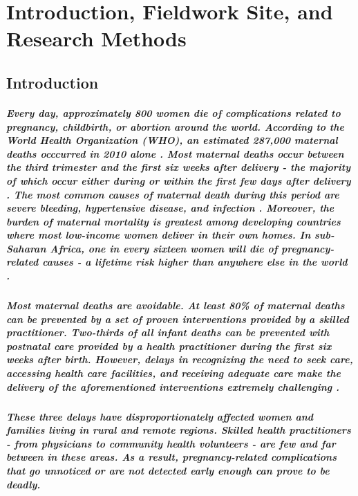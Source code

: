 \chapter{Introduction, Fieldwork Site, and Research Methods}
\section{Introduction}
\paragraph{Every day, approximately 800 women die of complications related to pregnancy, childbirth, or abortion around the world. According to the World Health Organization (WHO), an estimated 287,000 maternal deaths occcurred in 2010 alone \citep{WHO2012}. Most maternal deaths occur between the third trimester and the first six weeks after delivery - the majority of which occur either during or within the first few days after delivery \citep{WHO2012}. The most common causes of maternal death during this period are severe bleeding, hypertensive disease, and infection \citep{WHO2012}. Moreover, the burden of maternal mortality is greatest among developing countries where most low-income women deliver in their own homes. In sub-Saharan Africa, one in every sixteen women will die of pregnancy-related causes - a lifetime risk higher than anywhere else in the world \citep{Ronsmans2006}.}

\paragraph{Most maternal deaths are avoidable. At least 80\% of maternal deaths can be prevented by a set of proven interventions provided by a skilled practitioner. Two-thirds of all infant deaths can be prevented with postnatal care provided by a health practitioner during the first six weeks after birth. However, delays in recognizing the need to seek care, accessing health care facilities, and receiving  adequate care make the delivery of the aforementioned interventions extremely challenging \citep{Thaddeus1994}. }

\paragraph{These three delays have disproportionately affected women and families living in rural and remote regions. Skilled health practitioners - from physicians to community health volunteers - are few and far between in these areas.  As a result,  pregnancy-related complications that go unnoticed or are not detected early enough can prove to be deadly.}

